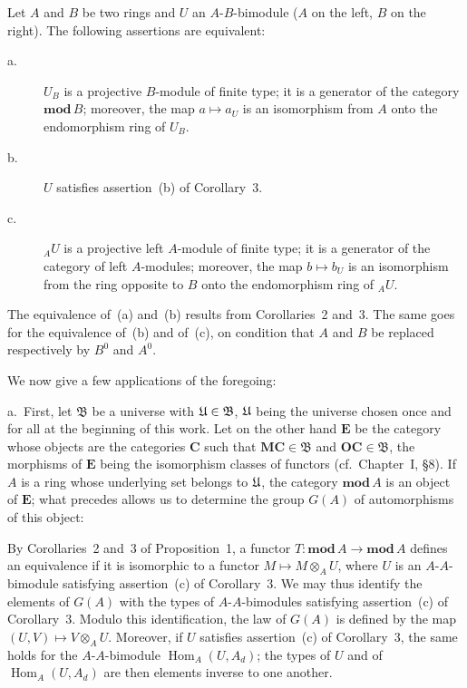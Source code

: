 \begin{corollary}
Let $A$ and $B$ be two rings and $U$ an $A$-$B$-bimodule ($A$ on the
left, $B$ on the right).  The following assertions are equivalent:
\begin{description}
\item[\normalfont a.] $U_B$ is a projective $B$-module of finite type;
      it is a generator of the category $\mathbf{mod}\,B$; moreover,
      the map $a\mapsto a_U$ is an isomorphism from $A$ onto the
      endomorphism ring of $U_B$.
\item[\normalfont b.] $U$ satisfies assertion~(b) of Corollary~3.
\item[\normalfont c.] ${}_AU$ is a projective left $A$-module of
      finite type; it is a generator of the category of left
      $A$-modules; moreover, the map $b\mapsto b_U$ is an isomorphism
      from the ring opposite to $B$ onto the endomorphism ring of
      ${}_AU$.
\end{description}
\end{corollary}

The equivalence of~(a) and~(b) results from Corollaries~2 and~3.  The
same goes for the equivalence of~(b) and of~(c), on condition that $A$
and $B$ be replaced respectively by $B^0$ and $A^0$.

We now give a few applications of the foregoing:

a.\ First, let $\mathfrak B$ be a universe with
$\mathfrak{U}\in\mathfrak B$, $\mathfrak{U}$ being the universe chosen once and for
all at the beginning of this work.  Let on the other hand
$\mathbf E$ be the category whose objects are the categories
$\mathbf C$ such that $\mathbf{MC}\in\mathfrak B$ and
$\mathbf{OC}\in\mathfrak B$, the morphisms of $\mathbf E$ being the
isomorphism classes of functors (cf.\ Chapter~I, \S8).  If $A$ is a
ring whose underlying set belongs to $\mathfrak{U}$, the category
$\mathbf{mod}\,A$ is an object of $\mathbf E$; what precedes allows us
to determine the group $G(A)$ of automorphisms of this object:

By Corollaries~2 and~3 of Proposition~1, a functor
$T\colon\mathbf{mod}\,A\to\mathbf{mod}\,A$ defines an equivalence if it
is isomorphic to a functor $M\mapsto M\otimes_A U$, where $U$ is an
$A$-$A$-bimodule satisfying assertion~(c) of Corollary~3.  We may thus
identify the elements of $G(A)$ with the types of $A$-$A$-bimodules
satisfying assertion~(c) of Corollary~3.  Modulo this identification,
the law of $G(A)$ is defined by the map
$(U,V)\mapsto V\otimes_A U$.  Moreover, if $U$ satisfies
assertion~(c) of Corollary~3, the same holds for the $A$-$A$-bimodule
$\operatorname{Hom}_A(U,A_d)$; the types of $U$ and of
$\operatorname{Hom}_A(U,A_d)$ are then elements inverse to one another.

